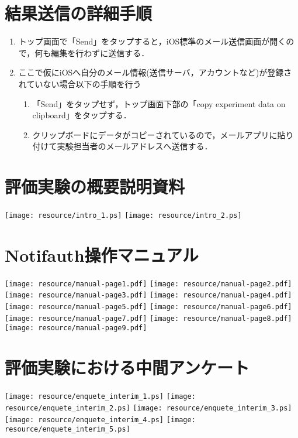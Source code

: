 \section{結果送信の詳細手順}
\begin{enumerate}
  \item トップ画面で「Send」をタップすると，iOS標準のメール送信画面が開くので，何も編集を行わずに送信する．
  \item ここで仮にiOSへ自分のメール情報(送信サーバ，アカウントなど)が登録されていない場合以下の手順を行う
  \begin{enumerate}
    \item 「Send」をタップせず，トップ画面下部の「copy experiment data on clipboard」をタップする．
    \item クリップボードにデータがコピーされているので，メールアプリに貼り付けて実験担当者のメールアドレスへ送信する．
  \end{enumerate}
\end{enumerate}

\newpage

\section{評価実験の概要説明資料}
\texttt{[image: resource/intro\_1.ps]}
\newpage
\texttt{[image: resource/intro\_2.ps]}
\newpage

\section{Notifauth操作マニュアル}
\texttt{[image: resource/manual-page1.pdf]}
\newpage
\texttt{[image: resource/manual-page2.pdf]}
\newpage
\texttt{[image: resource/manual-page3.pdf]}
\newpage
\texttt{[image: resource/manual-page4.pdf]}
\newpage
\texttt{[image: resource/manual-page5.pdf]}
\newpage
\texttt{[image: resource/manual-page6.pdf]}
\newpage
\texttt{[image: resource/manual-page7.pdf]}
\newpage
\texttt{[image: resource/manual-page8.pdf]}
\newpage
\texttt{[image: resource/manual-page9.pdf]}
\newpage

\section{評価実験における中間アンケート}\label{apdx:interimEnquete}
\texttt{[image: resource/enquete\_interim\_1.ps]}
\newpage
\texttt{[image: resource/enquete\_interim\_2.ps]}
\newpage
\texttt{[image: resource/enquete\_interim\_3.ps]}
\newpage
\texttt{[image: resource/enquete\_interim\_4.ps]}
\newpage
\texttt{[image: resource/enquete\_interim\_5.ps]}
\newpage

